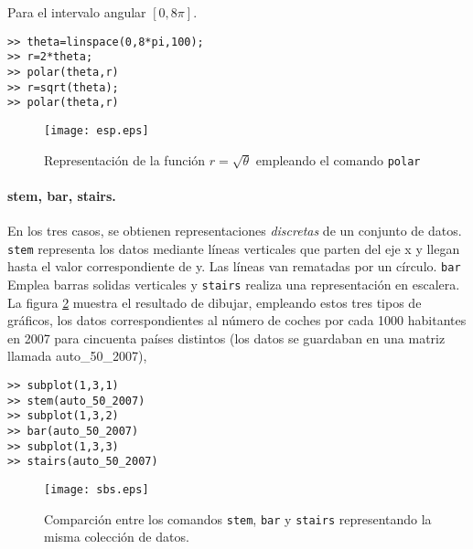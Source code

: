 Para el intervalo angular $[0,8\pi]$.
 
\begin{verbatim}
>> theta=linspace(0,8*pi,100);
>> r=2*theta;
>> polar(theta,r)
>> r=sqrt(theta);
>> polar(theta,r)
\end{verbatim}

\begin{figure}[h]
\centering
\texttt{[image: esp.eps]}
\caption{Representación de la función $r=\sqrt{\theta}$ empleando el comando \texttt{polar}}
\label{fig:esp}
\end{figure}

\paragraph{stem, bar, stairs.} En los tres casos, se obtienen representaciones \emph{discretas} de un conjunto de datos. \texttt{stem} representa los datos mediante líneas verticales que parten del eje  x y llegan hasta el valor correspondiente de y. Las líneas van rematadas por un círculo. \texttt{bar} Emplea barras solidas verticales  y \texttt{stairs} realiza una representación en escalera. La figura \ref{fig:sbs} muestra el resultado de dibujar, empleando estos tres tipos de gráficos, los datos correspondientes al número de coches por cada 1000 habitantes en 2007 para cincuenta países distintos (los datos se guardaban en una matriz llamada auto\_50\_2007),

\begin{verbatim}
>> subplot(1,3,1)
>> stem(auto_50_2007)
>> subplot(1,3,2)
>> bar(auto_50_2007)
>> subplot(1,3,3)
>> stairs(auto_50_2007)
\end{verbatim}

\begin{figure}[h]
\centering
\texttt{[image: sbs.eps]}
\caption{Comparción entre los comandos \texttt{stem}, \texttt{bar} y \texttt{stairs} representando la misma colección de datos.}
\label{fig:sbs}
\end{figure}

